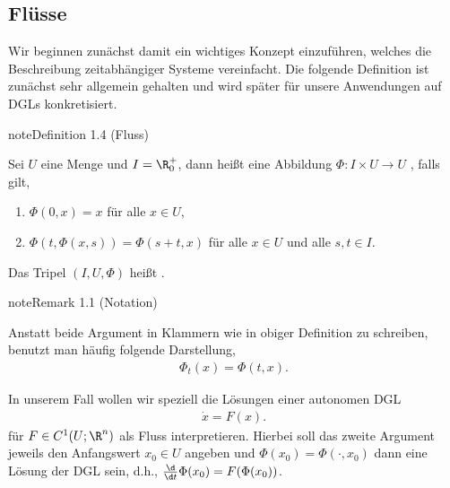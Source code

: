 \documentclass[letterpaper,10pt,english]{jupyterBook}
\begin{document}
\subsection{Flüsse}
\label{\detokenize{ode/fluesse:flusse}}
Wir beginnen zunächst damit ein wichtiges Konzept einzuführen, welches die Beschreibung zeitabhängiger Systeme vereinfacht. Die folgende Definition ist zunächst sehr allgemein gehalten und wird später für unsere Anwendungen auf DGLs konkretisiert.
\label{ode/fluesse:def:Fluss}
\begin{sphinxadmonition}{note}{Definition 1.4 (Fluss)}



Sei \(U\) eine Menge und \(I=\R^+_0\), dann heißt eine Abbildung \(\Phi:I\times U\rightarrow U\) , falls gilt,
\begin{enumerate}
%
\item {} 
\(\Phi(0, x) = x\) für alle \(x\in U\),

\item {} 
\(\Phi(t, \Phi(x,s)) = \Phi(s + t, x)\) für alle \(x\in U\) und alle \(s,t\in I\).

\end{enumerate}

Das Tripel \((I, U, \Phi)\) heißt .
\end{sphinxadmonition}
\label{ode/fluesse:remark-1}
\begin{sphinxadmonition}{note}{Remark 1.1 (Notation)}



Anstatt beide Argument in Klammern wie in obiger Definition zu schreiben, benutzt man häufig folgende Darstellung,
\begin{equation*}
\begin{split}\Phi_t(x) = \Phi(t, x).\end{split}
\end{equation*}\end{sphinxadmonition}

In unserem Fall wollen wir speziell die Lösungen einer autonomen DGL
\begin{equation*}
\begin{split}\dot{x} = F(x).\end{split}
\end{equation*}
für \(F\in C^1(U;\R^n)\) als Fluss interpretieren. Hierbei soll das zweite Argument jeweils den Anfangswert
\(x_0\in U\) angeben und \(\Phi(x_0) = \Phi(\cdot, x_0)\) dann eine Lösung der DGL sein, d.h., \(\frac{\d}{\d t} \Phi(x_0) = F(\Phi(x_0))\).
\end{document}
